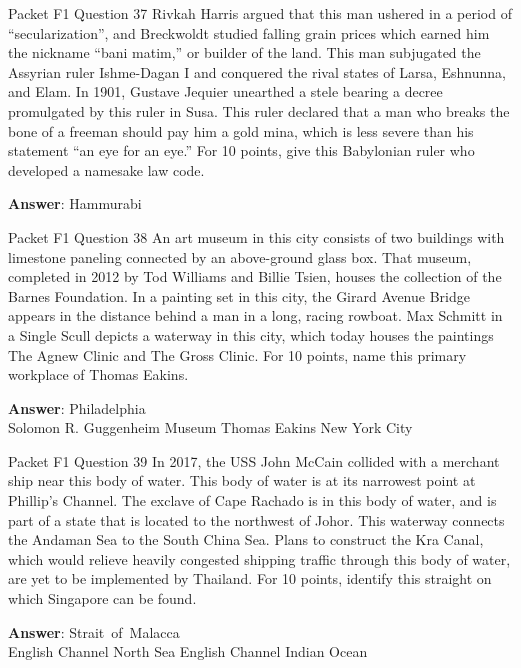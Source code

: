 \begin{frame}{Packet F1 Question 37}
Rivkah Harris argued that this man ushered in a period of ``secularization'', and Breckwoldt studied falling grain prices which earned him the nickname “bani matim,” or builder of the land. This man subjugated the Assyrian ruler Ishme-Dagan I and conquered the rival states of Larsa,   Eshnunna, and Elam.     In 1901, Gustave Jequier unearthed a stele bearing a decree promulgated by this ruler in Susa. This ruler declared that a man who breaks the bone of a freeman should pay him a gold mina, which is less severe than his statement “an eye for an eye.” For 10 points, give this Babylonian ruler who developed   a namesake law code. 

\textbf{Answer}: Hammurabi\\
\end{frame}

\begin{frame}{Packet F1 Question 38}
An art museum in this   city consists of two buildings with limestone paneling connected by an above-ground glass box. That museum, completed in 2012 by Tod Williams and Billie Tsien, houses the collection of the Barnes Foundation. In a painting set in this city, the Girard Avenue Bridge appears in the distance behind a man in a long, racing rowboat. Max Schmitt in a Single Scull depicts   a waterway in this city, which today houses the paintings The Agnew Clinic and The Gross Clinic.   For 10 points, name this primary workplace of Thomas Eakins.  

\textbf{Answer}: Philadelphia\\
 Solomon R. Guggenheim Museum
 Thomas Eakins
 New York City
\end{frame}

\begin{frame}{Packet F1 Question 39}
In 2017, the USS John McCain collided with a merchant ship near this body of water. This body of water is at its narrowest point at Phillip’s Channel. The exclave of Cape Rachado is in this body of water, and is part of a state that is located to the northwest of Johor. This waterway connects the Andaman   Sea to the South China Sea. Plans to construct the Kra Canal, which would relieve heavily congested shipping traffic through this body of water, are yet to be implemented by Thailand. For 10 points, identify this straight on which Singapore can be found.      

\textbf{Answer}: Strait\ of\ Malacca\\
 English Channel
 North Sea
 English Channel
 Indian Ocean
\end{frame}

